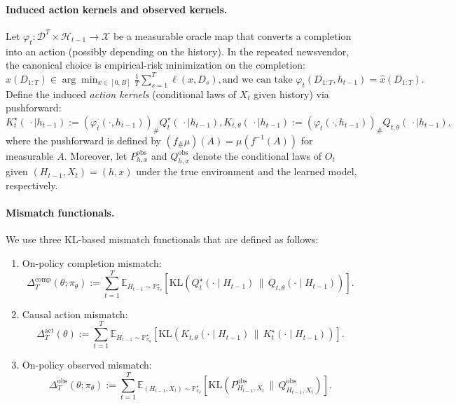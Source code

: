 \documentclass[11pt]{article}
\renewcommand{\P}{\mathbb{P}}
\begin{document}
\paragraph{Induced action kernels and observed kernels.}
Let $\varphi_t:\mathcal{D}^T\times \mathcal{H}_{t-1}\to\mathcal{X}$ be a measurable oracle map
that converts a completion into an action (possibly depending on the history).
In the repeated newsvendor, the canonical choice is empirical-risk minimization on the completion:
\(
\hat x(D_{1:T}) \in \arg\min_{x\in[0,B]} \frac{1}{T}\sum_{s=1}^T \ell(x,D_s), \text{and we can take }\varphi_t(D_{1:T},h_{t-1})=\hat x(D_{1:T}).
\)
Define the induced \emph{action kernels} (conditional laws of $X_t$ given history) via pushforward:
\(
K_t^\star(\,\cdot\mid h_{t-1}) := (\varphi_t(\cdot,h_{t-1}))_{\#} Q_t^\star(\,\cdot\mid h_{t-1}),
K_{t,\theta}(\,\cdot\mid h_{t-1}) := (\varphi_t(\cdot,h_{t-1}))_{\#} Q_{t,\theta}(\,\cdot\mid h_{t-1}),
\) where the pushforward is defined by $(f_{\#}\mu)(A)=\mu(f^{-1}(A))$ for measurable $A$. Moreover, let $P^{\mathrm{obs}}_{h,x}$ and $Q^{\mathrm{obs}}_{h,x}$ denote the conditional laws of $O_t$
given $(H_{t-1},X_t)=(h,x)$ under the true environment and the learned model, respectively.

\paragraph{Mismatch functionals.}We use three KL-based mismatch functionals that are defined as follows: 

\begin{enumerate}
\item On-policy completion mismatch:
\[
\Delta^{\mathrm{comp}}_{T}(\theta;\pi_\theta)
:=\sum_{t=1}^T \mathbb{E}_{H_{t-1}\sim \P_{\pi_\theta}^\star}\!\left[
\mathrm{KL}\!\left(Q_t^\star(\cdot\mid H_{t-1}) \,\big\|\, Q_{t,\theta}(\cdot\mid H_{t-1})\right)\right].
\]
\item Causal action mismatch:
\[
\Delta_{T}^{\mathrm{act}}(\theta)
:=\sum_{t=1}^T \mathbb{E}_{H_{t-1}\sim \P_{\pi_\theta}^\star}\!\left[
\mathrm{KL}\!\left(K_{t,\theta}(\cdot\mid H_{t-1}) \,\big\|\, K_t^\star(\cdot\mid H_{t-1})\right)\right].
\]
\item On-policy observed mismatch:
\[
\Delta^{\mathrm{obs}}_{T}(\theta;\pi_\theta)
:=\sum_{t=1}^T \mathbb{E}_{(H_{t-1},X_t)\sim \P_{\pi_\theta}^\star}\!\left[
\mathrm{KL}\!\left(P^{\mathrm{obs}}_{H_{t-1},X_t}\,\big\|\, Q^{\mathrm{obs}}_{H_{t-1},X_t}\right)\right].
\]
\end{enumerate}
\end{document}
